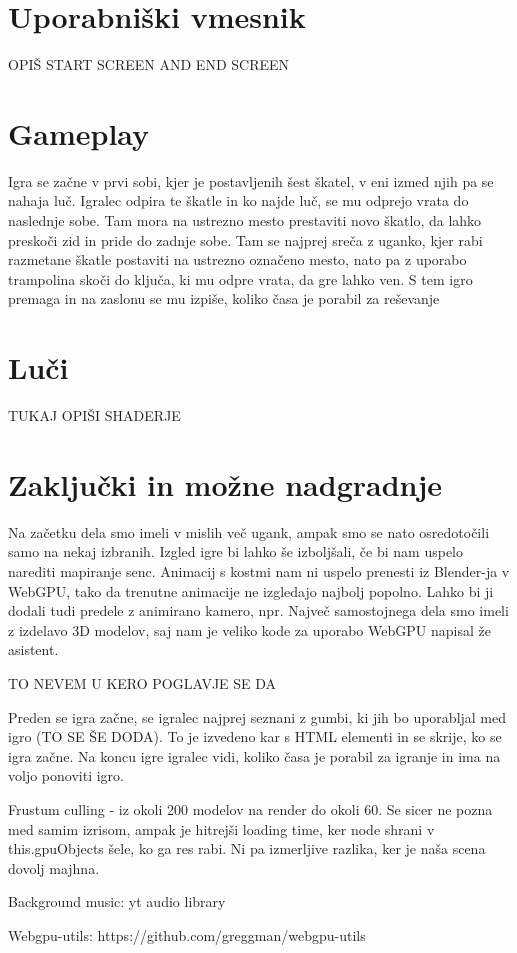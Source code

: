 \documentclass[a4paper,12pt]{article}
\begin{document}
\section{Uporabniški vmesnik}
\noindent OPIŠ  START SCREEN AND END SCREEN

\newpage

\section{Gameplay}
\noindent Igra se začne v prvi sobi, kjer je postavljenih šest škatel, v eni izmed njih pa se nahaja luč. Igralec odpira te škatle in ko najde luč, se mu odprejo vrata do naslednje sobe. Tam mora na ustrezno mesto prestaviti novo škatlo, da lahko preskoči zid in pride do zadnje sobe. Tam se najprej sreča z uganko, kjer rabi razmetane škatle postaviti na ustrezno označeno mesto, nato pa z uporabo trampolina skoči do ključa, ki mu odpre vrata, da gre lahko ven. S tem igro premaga in na zaslonu se mu izpiše, koliko časa je porabil za reševanje

\section{Luči}
TUKAJ OPIŠI SHADERJE

\newpage

\section{Zaključki in možne nadgradnje}
\noindent Na začetku dela smo imeli v mislih več ugank, ampak smo se nato osredotočili samo na nekaj izbranih. Izgled igre bi lahko še izboljšali, če bi nam uspelo narediti mapiranje senc. Animacij s kostmi nam ni uspelo prenesti iz Blender-ja v WebGPU, tako da trenutne animacije ne izgledajo najbolj popolno. Lahko bi ji dodali tudi predele z animirano kamero, npr. Največ samostojnega dela smo imeli z izdelavo 3D modelov, saj nam je veliko kode za uporabo WebGPU napisal že asistent.

 \newpage
 
 TO NEVEM U KERO POGLAVJE SE DA

Preden se igra začne, se igralec najprej seznani z gumbi, ki jih bo uporabljal med igro (TO SE ŠE DODA). To je izvedeno kar s HTML elementi in se skrije, ko se igra začne. Na koncu igre igralec vidi, koliko časa je porabil za igranje in ima na voljo ponoviti igro.

Frustum culling - iz okoli 200 modelov na render do okoli 60. Se sicer ne pozna med samim izrisom, ampak je hitrejši loading time, ker node shrani v this.gpuObjects šele, ko ga res rabi. Ni pa izmerljive razlika, ker je naša scena dovolj majhna.


Background music: yt audio library

Webgpu-utils: https://github.com/greggman/webgpu-utils
\end{document}
